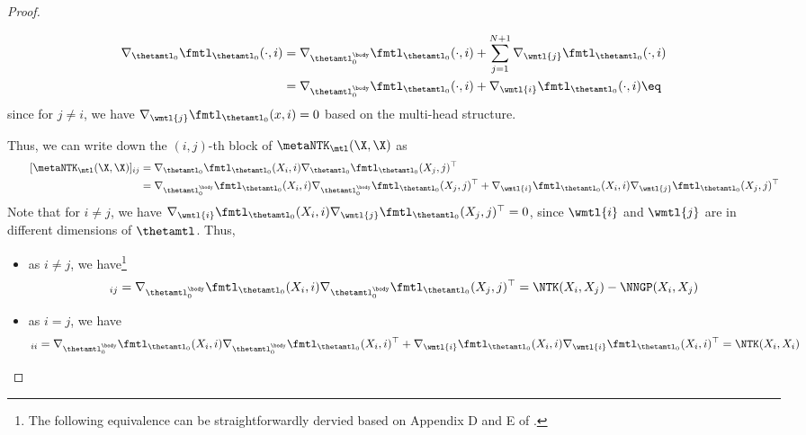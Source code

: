 \documentclass{article}
\begin{document}
\begin{proof}
\begin{itemize}[leftmargin=*,align=left,noitemsep,nolistsep]
\begin{itemize}[leftmargin=*,align=left,noitemsep,nolistsep]
\begin{align*}
            \nabla_{\thetamtl_0} \fmtl_{\thetamtl_0}(\cdot,i) &= \nabla_{\thetamtl_0^\body} \fmtl_{\thetamtl_0}(\cdot,i) + \sum_{j=1}^{N+1} \nabla_{\wmtl{j}} \fmtl_{\thetamtl_0}(\cdot,i) \\
            &=\nabla_{\thetamtl_0^\body} \fmtl_{\thetamtl_0}(\cdot,i) + \nabla_{\wmtl{i}} \fmtl_{\thetamtl_0}(\cdot,i) \eq\label{eq:fmtl_0-grad}
        \end{align*}
        since for $j\neq i$, we have $\nabla_{\wmtl{j}} \fmtl_{\thetamtl_0}(x,i)=0$ based on the multi-head structure.
        
        Thus, we can write down the $(i,j)$-th block of $\metaNTK_\mtl(\X,\X)$ as
        \begin{align*}
            \qquad [\metaNTK_\mtl(\X,\X)]_{ij}  
            &= \nabla_{\thetamtl_0} \fmtl_{\thetamtl_0}(X_i,i)\nabla_{\thetamtl_0} \fmtl_{\thetamtl_0}(X_j,j)^\top  \\
            &= \nabla_{\thetamtl_0^\body}\fmtl_{\thetamtl_0}(X_i,i)\nabla_{\thetamtl_0^\body} \fmtl_{\thetamtl_0}(X_j,j)^\top 
            + \nabla_{\wmtl{i}}\fmtl_{\thetamtl_0}(X_i,i)\nabla_{\wmtl{j}} \fmtl_{\thetamtl_0}(X_j,j)^\top
        \end{align*}
        Note that for $i\neq j$, we have $\nabla_{\wmtl{i}}\fmtl_{\thetamtl_0}(X_i,i)\nabla_{\wmtl{j}} \fmtl_{\thetamtl_0}(X_j,j)^\top = 0$, since $\wmtl{i}$ and $\wmtl{j}$ are in different dimensions of $\thetamtl$. Thus,
        \begin{itemize}
            \item as $i\neq j$, we have\footnote{The following equivalence can be straightforwardly dervied based on Appendix D and E of \cite{lee2019wide}.}
        \begin{align*}
            [\metaNTK_\mtl(\X,\X)]_{ij}  
            = \nabla_{\thetamtl_0^\body}\fmtl_{\thetamtl_0}(X_i,i)\nabla_{\thetamtl_0^\body} \fmtl_{\thetamtl_0}(X_j,j)^\top 
            = \NTK(X_i,X_j) - \NNGP(X_i,X_j)
        \end{align*}
            \item as $i = j$, we have
            \begin{align*}
                [\metaNTK_\mtl(\X,\X)]_{ii} =  \nabla_{\thetamtl_0^\body}\fmtl_{\thetamtl_0}(X_i,i)\nabla_{\thetamtl_0^\body} \fmtl_{\thetamtl_0}(X_i,i)^\top 
                + \nabla_{\wmtl{i}}\fmtl_{\thetamtl_0}(X_i,i)\nabla_{\wmtl{i}} \fmtl_{\thetamtl_0}(X_i,i)^\top 
                = \NTK(X_i,X_i)
            \end{align*}
        \end{itemize}

\end{itemize}
\end{itemize}
\end{proof}
\end{document}
